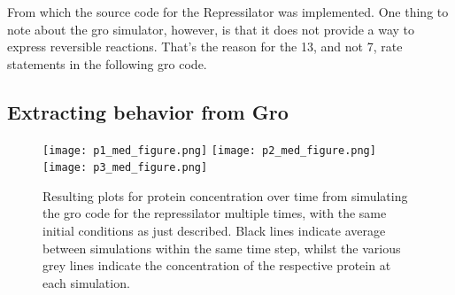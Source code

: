 \documentclass[12pt]{article}
\begin{document}
    From which the source code for the Repressilator was implemented. One thing to note about the gro simulator, however, is that it does not provide a way to express reversible reactions. That's the reason for the 13, and not 7, rate statements in the following gro code.
    
    

\subsection{Extracting behavior from Gro}

    \lipsum[1]
    
    \begin{figure}[ht]
    \centering
      \texttt{[image: p1\_med\_figure.png]}
    \endminipage\hfill
      \texttt{[image: p2\_med\_figure.png]}
    \endminipage\hfill
      \texttt{[image: p3\_med\_figure.png]}
    \endminipage
    \caption{Resulting plots for protein concentration over time from simulating the gro code for the repressilator multiple times, with the same initial conditions as just described. Black lines indicate average between simulations within the same time step, whilst the various grey lines indicate the concentration of the respective protein at each simulation.}
    \label{fig:tons_of_simulations}
    \end{figure}

    
\end{document}
